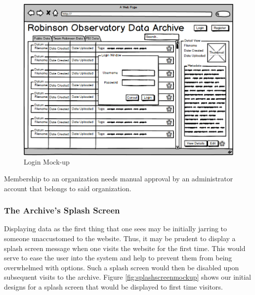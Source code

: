 \documentclass[12pt]{report}
\begin{document}
\begin{enumerate}
\begin{figure}[h]
	\centering
	\includegraphics[width=\linewidth]{login}
	\caption{Login Mock-up}
	\label{fig:loginmockup}
\end{figure}

Membership to an organization needs manual approval by an administrator account that belongs to said organization.


\subsubsection*{The Archive's Splash Screen}

Displaying data as the first thing that one sees may be initially jarring to someone unaccustomed to the website. Thus, it may be prudent to display a splash screen message when one visits the website for the first time. This would serve to ease the user into the system and help to prevent them from being overwhelmed with options. Such a splash screen would then be disabled upon subsequent visits to the archive. Figure \ref{fig:splashscreenmockup} shows our initial designs for a splash screen that would be displayed to first time visitors.


\end{enumerate}
\end{document}
